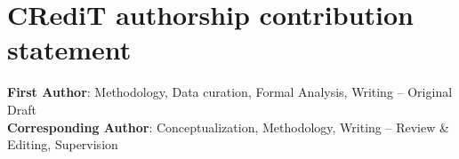 \documentclass{article}
\begin{document}
\section*{CRediT authorship contribution statement}
\textbf{First Author}: Methodology, Data curation, Formal Analysis, Writing – Original Draft\\
\textbf{Corresponding Author}: Conceptualization, Methodology, Writing – Review \& Editing, Supervision
\end{document}
